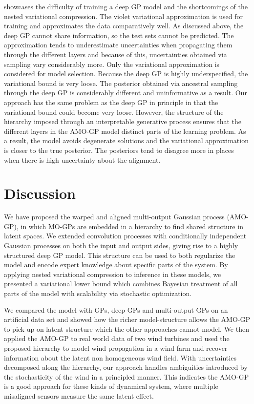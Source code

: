  showcases the difficulty of training a deep GP model and the shortcomings of the nested variational compression.
The violet variational approximation is used for training and approximates the data comparatively well.
As discussed above, the deep GP cannot share information, so the test sets cannot be predicted.
The approximation tends to underestimate uncertainties when propagating them through the different layers and because of this, uncertainties obtained via sampling vary considerably more.
Only the variational approximation is considered for model selection.
Because the deep GP is highly underspecified, the variational bound is very loose.
The posterior obtained via ancestral sampling through the deep GP is considerably different and uninformative as a result.
Our approach has the same problem as the deep GP in principle in that the variational bound could become very loose.
However, the structure of the hierarchy imposed through an interpretable generative process ensures that the different layers in the AMO-GP model distinct parts of the learning problem.
As a result, the model avoids degenerate solutions and the variational approximation is closer to the true posterior.
The posteriors tend to disagree more in places when there is high uncertainty about the alignment.


\section{Discussion}
We have proposed the warped and aligned multi-output Gaussian process (AMO-GP), in which MO-GPs are embedded in a hierarchy to find shared structure in latent spaces.
We extended convolution processes \parencite{boyle_dependent_2004} with conditionally independent Gaussian processes on both the input and output sides, giving rise to a highly structured deep GP model.
This structure can be used to both regularize the model and encode expert knowledge about specific parts of the system.
By applying nested variational compression \parencite{hensman_nested_2014} to inference in these models, we presented a variational lower bound which combines Bayesian treatment of all parts of the model with scalability via stochastic optimization.

We compared the model with GPs, deep GPs and multi-output GPs on an artificial data set and showed how the richer model-structure allows the AMO-GP to pick up on latent structure which the other approaches cannot model.
We then applied the AMO-GP to real world data of two wind turbines and used the proposed hierarchy to model wind propagation in a wind farm and recover information about the latent non homogeneous wind field.
With uncertainties decomposed along the hierarchy, our approach handles ambiguities introduced by the stochasticity of the wind in a principled manner.
This indicates the AMO-GP is a good approach for these kinds of dynamical system, where multiple misaligned sensors measure the same latent effect.

